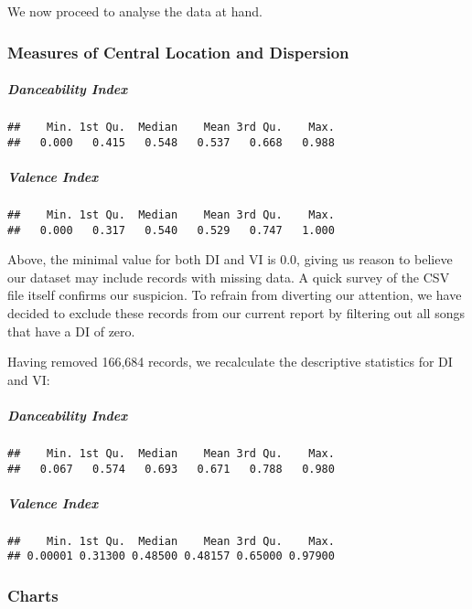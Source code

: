 \documentclass[
]{article}
\begin{document}
We now proceed to analyse the data at hand.

\hypertarget{measures-of-central-location-and-dispersion}{%
\subsubsection{Measures of Central Location and
Dispersion}\label{measures-of-central-location-and-dispersion}}

\hypertarget{danceability-index}{%
\subparagraph{Danceability Index}\label{danceability-index}}

\begin{verbatim}
##    Min. 1st Qu.  Median    Mean 3rd Qu.    Max. 
##   0.000   0.415   0.548   0.537   0.668   0.988
\end{verbatim}

\hypertarget{valence-index}{%
\subparagraph{Valence Index}\label{valence-index}}

\begin{verbatim}
##    Min. 1st Qu.  Median    Mean 3rd Qu.    Max. 
##   0.000   0.317   0.540   0.529   0.747   1.000
\end{verbatim}

Above, the minimal value for both DI and VI is 0.0, giving us reason to
believe our dataset may include records with missing data. A quick
survey of the CSV file itself confirms our suspicion. To refrain from
diverting our attention, we have decided to exclude these records from
our current report by filtering out all songs that have a DI of zero.

Having removed 166,684 records, we recalculate the descriptive
statistics for DI and VI:

\hypertarget{danceability-index-1}{%
\subparagraph{Danceability Index}\label{danceability-index-1}}

\begin{verbatim}
##    Min. 1st Qu.  Median    Mean 3rd Qu.    Max. 
##   0.067   0.574   0.693   0.671   0.788   0.980
\end{verbatim}

\hypertarget{valence-index-1}{%
\subparagraph{Valence Index}\label{valence-index-1}}

\begin{verbatim}
##    Min. 1st Qu.  Median    Mean 3rd Qu.    Max. 
## 0.00001 0.31300 0.48500 0.48157 0.65000 0.97900
\end{verbatim}

\hypertarget{charts}{%
\subsubsection{Charts}\label{charts}}
\end{document}
